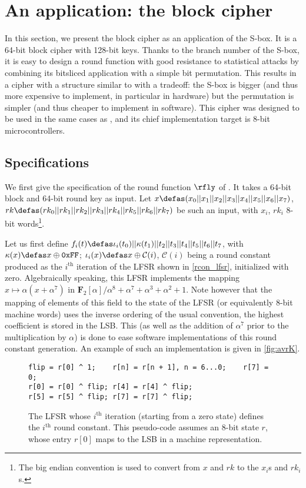 \section{An application: the \littlunpride block cipher}
\label{sec:fly}

In this section, we present the \fly block cipher as an application of the \littlunOne S-box. It is a 64-bit
block cipher with 128-bit keys.
Thanks to the branch
number of the S-box, it is easy to design a round function with good resistance to statistical attacks by combining
its bitsliced application with a simple bit permutation. This results in a cipher with a structure similar to \present \cite{present}
with a tradeoff: the S-box is bigger (and thus more expensive to implement, in particular in hardware) but the
permutation is simpler (and thus cheaper to implement in software).
This cipher was designed to be used in the same cases as \pride, and its chief implementation target is 8-bit microcontrollers.

\subsection{Specifications}

We first give the specification of the round function $\rfly$ of \fly. It takes a 64-bit block and 64-bit round key as input.
Let $x \defas (x_0||x_1||x_2||x_3||x_4||x_5||x_6||x_7)$, $rk \defas (rk_0||rk_1||rk_2||rk_3||rk_4||rk_5||rk_6|| rk_7)$ be such
an input, with $x_i$, $rk_i$ 8-bit words\footnote{The big endian convention is used to convert from $x$ and $rk$ to the $x_i$s and $rk_i$s.}.

Let us first define $f_i(t) \defas \iota_i(t_0)||\kappa(t_1)||t_2||t_3||t_4||t_5||t_6||t_7$, with $\kappa(x) \defas x \oplus \texttt{0xFF}$;
$\iota_i(x) \defas x \oplus \mathcal{C}(i)$,
$\mathcal{C}(i)$ being a round constant produced as the $i^\text{th}$ iteration of the LFSR shown in
\autoref{rcon_lfsr}, initialized with zero. Algebraically speaking, this LFSR implements the mapping $x \mapsto \alpha(x + \alpha^7)$
in $\mathbf{F}_2[\alpha]/\alpha^8+\alpha^7+\alpha^3+\alpha^2+1$. Note however that the mapping of elements of this field to the state of the
LFSR (or equivalently 8-bit machine words) uses the inverse ordering of the usual convention, \ie{} the highest coefficient is
stored in the LSB. This (as well as the addition of $\alpha^7$ prior to the multiplication by $\alpha$) is done to ease software implementations
of this round constant generation. An example of such an implementation is given in 
\autoref{fig:avrK}.
\begin{figure}[ht]
\begin{verbatim}
flip = r[0] ^ 1;    r[n] = r[n + 1], n = 6...0;    r[7] = 0;
r[0] = r[0] ^ flip; r[4] = r[4] ^ flip;
r[5] = r[5] ^ flip; r[7] = r[7] ^ flip;
\end{verbatim}
\caption[The round-constant-generating LFSR.]{The LFSR whose $i^\text{th}$ iteration (starting from a zero state) defines the $i^\text{th}$ round constant. This pseudo-code
assumes an 8-bit state $r$, whose entry $r[0]$ maps to the LSB in a machine representation\label{rcon_lfsr}.}
\end{figure}


